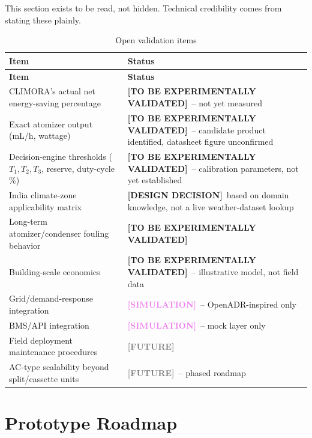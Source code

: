 \documentclass[11pt,a4paper]{article}
\newcommand{\design}{\textcolor{blue!60!black}{\textbf{[DESIGN DECISION]}}}
\newcommand{\tobevalidated}{\textcolor{red!70!black}{\textbf{[TO BE EXPERIMENTALLY VALIDATED]}}}
\newcommand{\simulation}{\textcolor{violet}{\textbf{[SIMULATION]}}}
\newcommand{\future}{\textcolor{gray}{\textbf{[FUTURE]}}}
\begin{document}
This section exists to be read, not hidden. Technical credibility comes from stating these plainly.

\begin{longtable}{p{6.5cm}p{7cm}}
\caption{Open validation items} \\
\toprule
\textbf{Item} & \textbf{Status} \\
\midrule
\endfirsthead
\toprule
\textbf{Item} & \textbf{Status} \\
\midrule
\endhead
CLIMORA's actual net energy-saving percentage & \tobevalidated\ -- not yet measured \\
Exact atomizer output (mL/h, wattage) & \tobevalidated\ -- candidate product identified, datasheet figure unconfirmed \\
Decision-engine thresholds ($T_1,T_2,T_3$, reserve, duty-cycle \%) & \tobevalidated\ -- calibration parameters, not yet established \\
India climate-zone applicability matrix & \design\ based on domain knowledge, not a live weather-dataset lookup \\
Long-term atomizer/condenser fouling behavior & \tobevalidated \\
Building-scale economics & \tobevalidated\ -- illustrative model, not field data \\
Grid/demand-response integration & \simulation\ -- OpenADR-inspired only \\
BMS/API integration & \simulation\ -- mock layer only \\
Field deployment maintenance procedures & \future \\
AC-type scalability beyond split/cassette units & \future\ -- phased roadmap \\
\bottomrule
\end{longtable}

\section{Prototype Roadmap}
\end{document}
